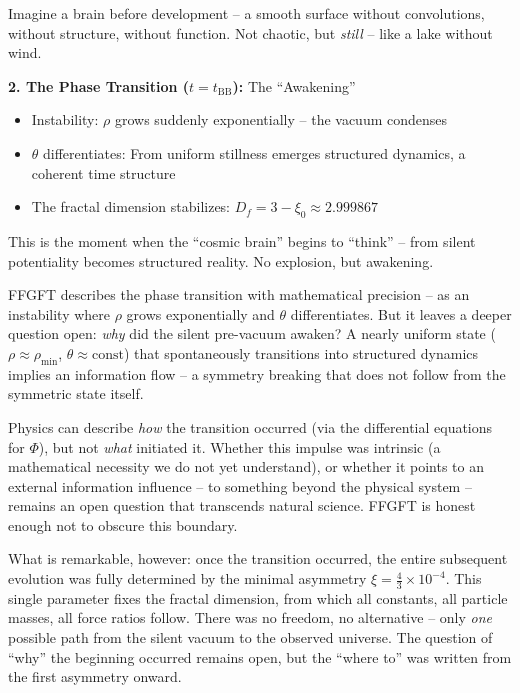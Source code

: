 Imagine a brain before development -- a smooth surface without convolutions, without structure, without function. Not chaotic, but \textit{still} -- like a lake without wind.

\textbf{2. The Phase Transition ($t = t_{\text{BB}}$):} The ``Awakening''

\begin{itemize}[leftmargin=*]
\item Instability: $\rho$ grows suddenly exponentially -- the vacuum condenses
\item $\theta$ differentiates: From uniform stillness emerges structured dynamics, a coherent time structure
\item The fractal dimension stabilizes: $D_f = 3 - \xi_0 \approx 2.999867$
\end{itemize}

This is the moment when the ``cosmic brain'' begins to ``think'' -- from silent potentiality becomes structured reality. No explosion, but awakening.

\begin{remark}
FFGFT describes the phase transition with mathematical precision -- as an instability where $\rho$ grows exponentially and $\theta$ differentiates. But it leaves a deeper question open: \textit{why} did the silent pre-vacuum awaken? A nearly uniform state ($\rho \approx \rho_{\min}$, $\theta \approx \text{const}$) that spontaneously transitions into structured dynamics implies an information flow -- a symmetry breaking that does not follow from the symmetric state itself.

Physics can describe \textit{how} the transition occurred (via the differential equations for $\Phi$), but not \textit{what} initiated it. Whether this impulse was intrinsic (a mathematical necessity we do not yet understand), or whether it points to an external information influence -- to something beyond the physical system -- remains an open question that transcends natural science. FFGFT is honest enough not to obscure this boundary.

What is remarkable, however: once the transition occurred, the entire subsequent evolution was fully determined by the minimal asymmetry $\xi = \frac{4}{3} \times 10^{-4}$. This single parameter fixes the fractal dimension, from which all constants, all particle masses, all force ratios follow. There was no freedom, no alternative -- only \textit{one} possible path from the silent vacuum to the observed universe. The question of ``why'' the beginning occurred remains open, but the ``where to'' was written from the first asymmetry onward.
\end{remark}

